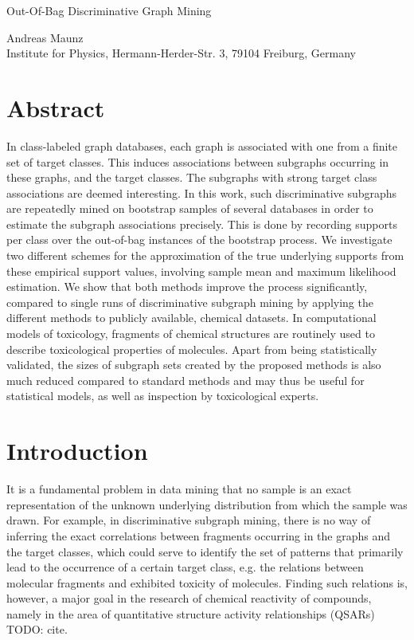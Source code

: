 \documentclass{article}
\begin{document}

\begin{center}
\begin{huge}Out-Of-Bag Discriminative Graph Mining\end{huge}

Andreas Maunz \\Institute for Physics, Hermann-Herder-Str. 3, 79104 Freiburg, Germany
\end{center}

\section{Abstract}

In class-labeled graph databases, each graph is associated with one from a
finite set of target classes.  This induces associations between subgraphs
occurring in these graphs, and the target classes. The subgraphs with strong
target class associations are deemed interesting.
In this work, such discriminative subgraphs are repeatedly mined on bootstrap
samples of several databases in order to estimate
the subgraph associations precisely.  This is done by recording supports per class
over the out-of-bag instances of the bootstrap process. 
We investigate two different schemes for the approximation of the true
underlying supports from these empirical support values, involving
sample mean and maximum likelihood estimation.  We show that both methods
improve the process significantly, compared to single runs of discriminative
subgraph mining by applying the different methods to publicly available,
chemical datasets.
In computational models of toxicology, fragments of chemical structures are
routinely used to describe toxicological properties of molecules. Apart from
being statistically validated, the sizes of subgraph sets created by the
proposed methods is also much reduced compared to standard methods and may thus
be useful for statistical models, as well as inspection by toxicological
experts.

\section{Introduction}
It is a fundamental problem in data mining that no sample is an exact
representation of the unknown underlying distribution from which the sample was
drawn.  For example, in discriminative subgraph mining, there is no way of
inferring the exact correlations between fragments occurring in the graphs and
the target classes, which could serve to identify the set of patterns that
primarily lead to the occurrence of a certain target class, e.g. the relations
between molecular fragments and exhibited toxicity of molecules. Finding such
relations is, however, a major goal in the research of chemical reactivity of
compounds, namely in the area of quantitative structure activity relationships
(QSARs) TODO: cite.
\end{document}
